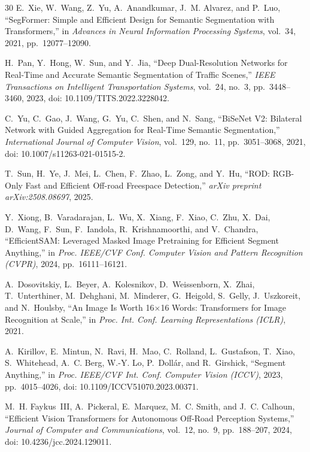 \begin{thebibliography}{30}
E.~Xie, W.~Wang, Z.~Yu, A.~Anandkumar, J.~M. Alvarez, and P.~Luo,
``SegFormer: Simple and Efficient Design for Semantic Segmentation with
Transformers,'' in \emph{Advances in Neural Information Processing Systems},
vol.~34, 2021, pp.~12077--12090.

H.~Pan, Y.~Hong, W.~Sun, and Y.~Jia,
``Deep Dual-Resolution Networks for Real-Time and Accurate Semantic
Segmentation of Traffic Scenes,'' \emph{IEEE Transactions on Intelligent
Transportation Systems}, vol.~24, no.~3, pp.~3448--3460, 2023,
doi: 10.1109/TITS.2022.3228042.

C.~Yu, C.~Gao, J.~Wang, G.~Yu, C.~Shen, and N.~Sang,
``BiSeNet V2: Bilateral Network with Guided Aggregation for Real-Time Semantic
Segmentation,'' \emph{International Journal of Computer Vision},
vol.~129, no.~11, pp.~3051--3068, 2021,
doi: 10.1007/s11263-021-01515-2.

T.~Sun, H.~Ye, J.~Mei, L.~Chen, F.~Zhao, L.~Zong, and Y.~Hu,
``ROD: RGB-Only Fast and Efficient Off-road Freespace Detection,''
\emph{arXiv preprint arXiv:2508.08697}, 2025.

Y.~Xiong, B.~Varadarajan, L.~Wu, X.~Xiang, F.~Xiao, C.~Zhu, X.~Dai,
D.~Wang, F.~Sun, F.~Iandola, R.~Krishnamoorthi, and V.~Chandra,
``EfficientSAM: Leveraged Masked Image Pretraining for Efficient Segment
Anything,'' in \emph{Proc. IEEE/CVF Conf. Computer Vision and Pattern
Recognition (CVPR)}, 2024, pp.~16111--16121.

A.~Dosovitskiy, L.~Beyer, A.~Kolesnikov, D.~Weissenborn, X.~Zhai,
T.~Unterthiner, M.~Dehghani, M.~Minderer, G.~Heigold, S.~Gelly, J.~Uszkoreit,
and N.~Houlsby,
``An Image Is Worth 16$\times$16 Words: Transformers for Image Recognition at
Scale,'' in \emph{Proc. Int. Conf. Learning Representations (ICLR)}, 2021.

A.~Kirillov, E.~Mintun, N.~Ravi, H.~Mao, C.~Rolland, L.~Gustafson, T.~Xiao,
S.~Whitehead, A.~C. Berg, W.-Y. Lo, P.~Doll\'{a}r, and R.~Girshick,
``Segment Anything,'' in \emph{Proc. IEEE/CVF Int. Conf. Computer Vision
(ICCV)}, 2023, pp.~4015--4026,
doi: 10.1109/ICCV51070.2023.00371.

M.~H. Faykus~III, A.~Pickeral, E.~Marquez, M.~C. Smith, and J.~C. Calhoun,
``Efficient Vision Transformers for Autonomous Off-Road Perception Systems,''
\emph{Journal of Computer and Communications}, vol.~12, no.~9,
pp.~188--207, 2024, doi: 10.4236/jcc.2024.129011.


\end{thebibliography}
